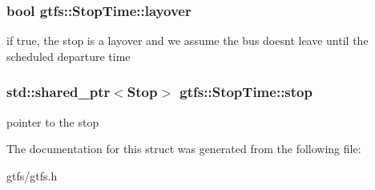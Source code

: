 \subsubsection[{\texorpdfstring{layover}{layover}}]{\setlength{\rightskip}{0pt plus 5cm}bool gtfs\+::\+Stop\+Time\+::layover}\hypertarget{structgtfs_1_1StopTime_af8cc780329a837a49a5d6af60b74b9bf}{}\label{structgtfs_1_1StopTime_af8cc780329a837a49a5d6af60b74b9bf}
if true, the stop is a layover and we assume the bus doesn\textquotesingle{}t leave until the scheduled departure time 
\subsubsection[{\texorpdfstring{stop}{stop}}]{\setlength{\rightskip}{0pt plus 5cm}std\+::shared\+\_\+ptr$<${\bf Stop}$>$ gtfs\+::\+Stop\+Time\+::stop}\hypertarget{structgtfs_1_1StopTime_a586702c54a1ad350d486c6639558b4ca}{}\label{structgtfs_1_1StopTime_a586702c54a1ad350d486c6639558b4ca}
pointer to the stop 

The documentation for this struct was generated from the following file\+:\begin{DoxyCompactItemize}
\item 
gtfs/gtfs.\+h\end{DoxyCompactItemize}

